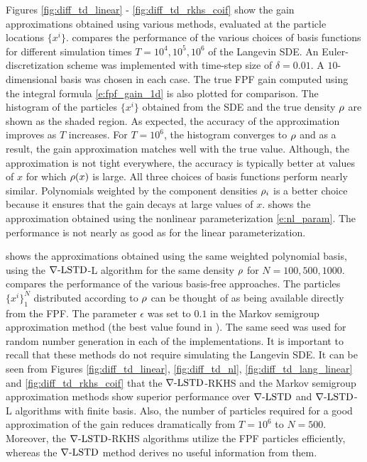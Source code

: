 Figures \ref{fig:diff_td_linear} - \ref{fig:diff_td_rkhs_coif} show the gain approximations obtained using various methods, evaluated at the particle locations $\{x^i\}$.  compares the performance of the various choices of basis functions for different simulation times $T = 10^4, 10^5, 10^6$ of the Langevin SDE. An Euler-discretization scheme was implemented with time-step size of $\delta = 0.01$. A $10$-dimensional basis was chosen in each case. The true FPF gain computed using the integral formula \eqref{e:fpf_gain_1d} is also plotted for comparison. The histogram of the particles $\{x^i\}$ obtained from the SDE and the true density $\rho$ are shown as the shaded region. As expected, the accuracy of the approximation improves as $T$ increases. For $T=10^6$, the histogram converges to $\rho$ and as a result, the gain approximation matches well with the true value. Although, the approximation is not tight everywhere, the accuracy is typically better at values of $x$ for which $\rho(x)$ is large. All three choices of basis functions perform nearly similar. Polynomials weighted by the component densities $\rho_i$ is a better choice because it ensures that the gain decays at large values of $x$.  shows the approximation obtained using the nonlinear parameterization \eqref{e:nl_param}. The performance is not nearly as good as for the linear parameterization.

 shows the approximations obtained using the same weighted polynomial basis, using the $\nabla\text{-LSTD}$-L algorithm for the same density $\rho$ for $N = 100,500,1000$.
 compares the performance of the various basis-free approaches. The particles $\{x^i\}_1^N$ distributed according to $\rho$ can be thought of as being available directly from the FPF. The parameter $\epsilon$ was set to $0.1$ in the Markov semigroup approximation method (the best value found in \cite{tagmeh16a}). The same seed was used for random number generation in each of the implementations. It is important to recall that these methods do not require simulating the Langevin SDE. It can be seen from Figures \ref{fig:diff_td_linear}, \ref{fig:diff_td_nl}, \ref{fig:diff_td_lang_linear} and \ref{fig:diff_td_rkhs_coif} that the $\nabla\text{-LSTD}$-RKHS and the Markov semigroup approximation methods show superior performance over $\nabla\text{-LSTD}$ and $\nabla\text{-LSTD}$-L algorithms with finite basis. Also, the number of particles required for a good approximation of the gain reduces dramatically from $T=10^6$ to $N=500$. Moreover, the $\nabla\text{-LSTD}$-RKHS algorithms utilize the FPF particles efficiently, whereas the $\nabla\text{-LSTD}$ method derives no useful information from them.   

